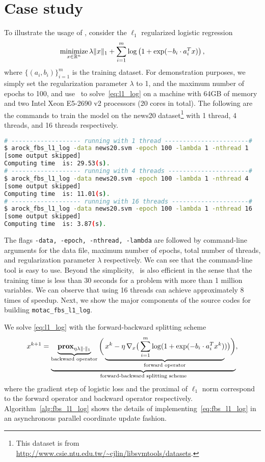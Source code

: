 \section{Case study}\label{sec:quick_start}
To illustrate the  usage of \pkg, consider the $\ell_1$ regularized logistic regression~\citep{ng2004feature}
\begin{equation}\label{eq:l1_log}
\operatorname*{minimize}_{x \in \mathbb{R}^n} \lambda \|x\|_1 + \sum_{i = 1}^m \log\left(1 + \exp(-b_i \cdot a_i^T x)\right),
\end{equation}
where $\{(a_i, b_i)\}_{i = 1}^m$ is the training dataset. For demonstration purposes, we simply set the regularization parameter
$\lambda$ to 1, and the maximum number of epochs to 100, and use \pkg~to solve~\eqref{eq:l1_log} on a machine with 64GB of memory and two Intel Xeon E5-2690 v2 processors (20 cores in total). The following are the commands to train the model
on the news20 dataset\footnote{ This dataset is from \url{http://www.csie.ntu.edu.tw/~cjlin/libsvmtools/datasets}.} with 1 thread, 4 threads, and 16 threads respectively.
\begin{lstlisting}[language=bash]
# ------------------- running with 1 thread -----------------------#
$ arock_fbs_l1_log -data news20.svm -epoch 100 -lambda 1 -nthread 1
[some output skipped]
Computing time  is: 29.53(s).
# ------------------- running with 4 threads ----------------------#
$ arock_fbs_l1_log -data news20.svm -epoch 100 -lambda 1 -nthread 4
[some output skipped]
Computing time  is: 11.01(s).
# ------------------- running with 16 threads ---------------------#
$ arock_fbs_l1_log -data news20.svm -epoch 100 -lambda 1 -nthread 16
[some output skipped]
Computing time  is: 3.87(s).
\end{lstlisting}
The flags \texttt{-data, -epoch, -nthread, -lambda} are followed by command-line arguments for the data file, maximum number of epochs,
total number of threads, and regularization parameter $\lambda$ respectively. We can see that the command-line
tool is easy to use. Beyond the simplicity, \pkg~is also efficient in the sense that the training time is
less than 30 seconds for a problem with more than 1 million variables. We can observe that using 16 threads can achieve approximately 8 times of speedup. Next, we show the major components of the source
codes for building \texttt{motac\_fbs\_l1\_log}.

We solve \eqref{eq:l1_log} with the forward-backward splitting scheme
\begin{equation}\label{eq:fbs_l1_log}
  x^{k+1} = \underbrace{\underbrace{\mathbf{prox}_{ \eta \lambda \|\cdot\|_1}}_{\text{backward operator}}
  \bigg(\underbrace{x^k - \eta \, \nabla_{x} \big(\sum_{i = 1}^m \log (1 + \exp(-b_i \cdot a_i^T x^k)}_{\text{forward operator}})\big)\bigg)}_{\text{forward-backward splitting scheme}},
\end{equation}
where the gradient step of logistic loss and the proximal of $\ell_1$ norm correspond to the
forward operator and backward operator respectively. Algorithm~\ref{alg:fbs_l1_log} shows the details of
implementing~\eqref{eq:fbs_l1_log} in an asynchronous parallel coordinate update fashion.

